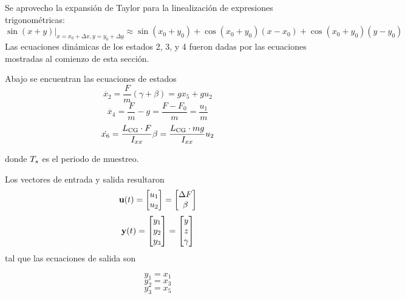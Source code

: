 Se aprovecho la expansión de Taylor para la linealización de expresiones trigonométricas:
\[
\sin(x+y)|_{x=x_0+\Delta x,y=y_0+\Delta y} \approx \sin(x_0+y_0) + \cos(x_0 + y_0) (x-x_0) + \cos(x_0 + y_0) (y-y_0)
\]
Las ecuaciones dinámicas de los estados 2, 3, y 4 fueron dadas por las ecuaciones mostradas al comienzo de esta sección.

Abajo se encuentran las ecuaciones de estados
\begin{equation}
	\dot{x_2} = \frac{F}{m} \left( \gamma+\beta \right) = g x_5 + g u_2 
\end{equation}
\begin{equation}
\dot{x_4} = \frac{F}{m} - g =\frac{F-F_0}{m}= \frac{u_1}{m}
\end{equation}
\begin{equation}
\dot{x_6} = \frac{L_{\mathrm{CG}} \cdot F}{I_{xx}} \beta = \frac{L_{\mathrm{CG}} \cdot mg}{I_{xx}} u_2 
\end{equation}

donde $T_s$ es el periodo de muestreo.

Los vectores de entrada y salida resultaron
\[
\mathbf{u}(t) = \begin{bmatrix}
u_1 \\
u_2
\end{bmatrix} = \begin{bmatrix}
\Delta F \\
\beta
\end{bmatrix}
\]
\[
\mathbf{y}(t) = \begin{bmatrix}
y_1 \\
y_2 \\
y_3
\end{bmatrix} = \begin{bmatrix}
y \\
z \\
\gamma
\end{bmatrix}
\]
tal que las ecuaciones de salida son

\begin{equation}
	y_1 = x_1 
\end{equation}
\begin{equation}
	y_2 = x_3
\end{equation}
\begin{equation}
	y_3 = x_5
\end{equation}

